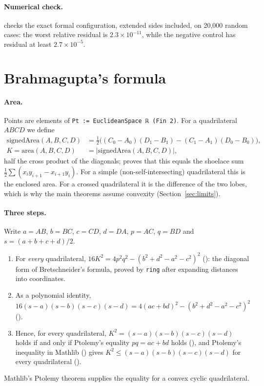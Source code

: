 \documentclass[11pt]{article}
\theoremstyle{definition}
\theoremstyle{remark}
\newcommand{\lean}[1]{\texttt{#1}}
\begin{document}
\paragraph{Numerical check.}  checks the exact formal
configuration, extended sides included, on 20{,}000 random cases: the worst relative residual is
$2.3\times10^{-11}$, while the negative control has residual at least $2.7\times10^{-5}$.

\section{Brahmagupta's formula}\label{sec:brahmagupta}

\paragraph{Area.} Points are elements of \lean{Pt := EuclideanSpace ℝ (Fin 2)}. For a
quadrilateral $ABCD$ we define
\begin{align*}
\mathrm{signedArea}(A,B,C,D)&=\tfrac12\big((C_0-A_0)(D_1-B_1)-(C_1-A_1)(D_0-B_0)\big),\\
K=\mathrm{area}(A,B,C,D)&=|\mathrm{signedArea}(A,B,C,D)|,
\end{align*}
half the cross product of the diagonals;  proves that
this equals the shoelace sum $\tfrac12\sum(x_iy_{i+1}-x_{i+1}y_i)$. For a simple (non-self-intersecting)
quadrilateral this is the enclosed area. For a crossed quadrilateral it is the difference of the
two lobes, which is why the main theorems assume convexity (Section~\ref{sec:limits}).

\paragraph{Three steps.} Write $a=AB$, $b=BC$, $c=CD$, $d=DA$, $p=AC$, $q=BD$ and $s=(a+b+c+d)/2$.
\begin{enumerate}
\item For \emph{every} quadrilateral, $16K^2=4p^2q^2-(b^2+d^2-a^2-c^2)^2$
(): the diagonal form of Bretschneider's formula, proved by
\lean{ring} after expanding distances into coordinates.
\item As a polynomial identity,
$16(s-a)(s-b)(s-c)(s-d)=4(ac+bd)^2-(b^2+d^2-a^2-c^2)^2$ ().
\item Hence, for every quadrilateral, $K^2=(s-a)(s-b)(s-c)(s-d)$ holds if and only if Ptolemy's
equality $pq=ac+bd$ holds (), and Ptolemy's inequality
in Mathlib () gives
$K^2\le(s-a)(s-b)(s-c)(s-d)$ for every quadrilateral ().
\end{enumerate}
Mathlib's Ptolemy theorem 
supplies the equality for a convex cyclic quadrilateral.
\end{document}
